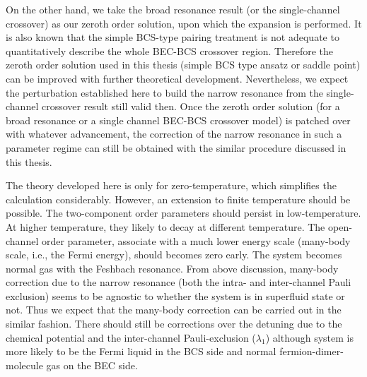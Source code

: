        On the other hand, we take the broad resonance result (or the single-channel crossover) as our zeroth order solution, upon which the expansion is performed.  It is also known that the simple BCS-type pairing treatment is not adequate  to quantitatively describe the whole BEC-BCS crossover region.  Therefore the zeroth order solution used in this thesis (simple BCS type ansatz or saddle point) can be improved with further theoretical development.  Nevertheless, we expect the perturbation established here to build the narrow resonance from the single-channel crossover result still valid then.  Once the zeroth order solution (for a broad resonance or a single channel BEC-BCS crossover model) is patched over with whatever advancement, the correction of the narrow resonance in such a parameter regime can still be obtained with the similar procedure discussed in this thesis.  
       
       
\begin{unsure}
The theory developed here is only for zero-temperature, which simplifies the calculation considerably.  However, an extension to finite temperature should be possible.  The two-component order parameters should persist in low-temperature.  At higher temperature, they likely to decay at different temperature.  The open-channel order parameter, associate with a much lower energy scale (many-body scale, i.e., the Fermi energy), should becomes zero early.  The system becomes normal gas with the Feshbach resonance.  From above discussion, many-body correction due to the narrow resonance (both the intra- and inter-channel Pauli exclusion) seems to be agnostic to whether the system is in superfluid state or not.  Thus we expect that the many-body correction can be carried out in the similar fashion.   There should still be corrections over the detuning due to the chemical potential and the  inter-channel Pauli-exclusion ($\lambda_{1}$) although system is more likely to be the Fermi liquid in the BCS side and normal fermion-dimer-molecule gas on the BEC side.   
\end{unsure}
